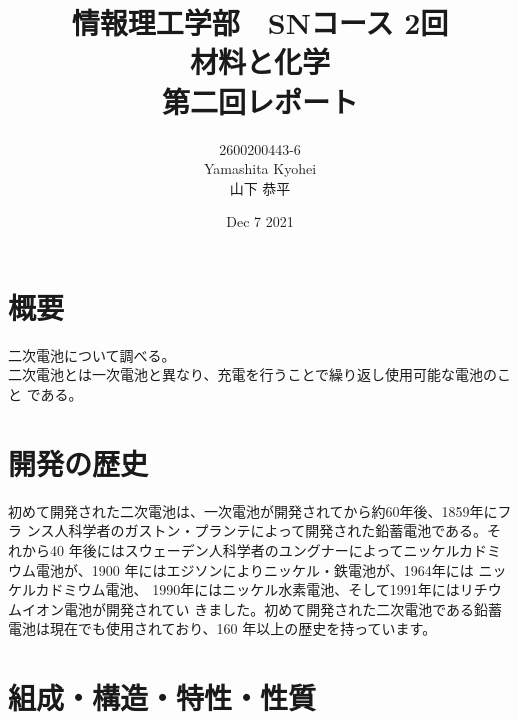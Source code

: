 \documentclass[dvipdfmx,autodetect-engine,titlepage]{jsarticle}
\title{情報理工学部　SNコース 2回\\
材料と化学\\
第二回レポート}
\author{2600200443-6\\Yamashita Kyohei\\山下 恭平}
\date{Dec 7 2021}
\begin{document}
\maketitle

\section{概要}
二次電池について調べる。\\
二次電池とは一次電池と異なり、充電を行うことで繰り返し使用可能な電池のこと
である。

\section{開発の歴史}
初めて開発された二次電池は、一次電池が開発されてから約60年後、1859年にフラ
ンス人科学者のガストン・プランテによって開発された鉛蓄電池である。それから40
年後にはスウェーデン人科学者のユングナーによってニッケルカドミウム電池が、1900
年にはエジソンによりニッケル・鉄電池が、1964年には ニッケルカドミウム電池、
1990年にはニッケル水素電池、そして1991年にはリチウムイオン電池が開発されてい
きました。初めて開発された二次電池である鉛蓄電池は現在でも使用されており、160
年以上の歴史を持っています。

\section{組成・構造・特性・性質}
\end{document}
